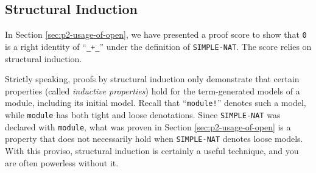 \documentclass[a4paper]{memoir}
\begin{document}
\subsection{Structural Induction}\label{sec:p2-proof-by-induction}

In Section \ref{sec:p2-usage-of-open}, we have presented a
proof score to show that \verb|0| is a right identity of ``\verb|_+_|''
under the definition of \verb|SIMPLE-NAT|. The score relies on
structural induction.

Strictly speaking, proofs by structural induction only demonstrate
that certain properties (called
{\em inductive properties}) hold for
the term-generated models of a module, including its initial model.
Recall that ``\verb|module!|'' denotes such a
model, while \verb|module| has both tight and loose denotations.
Since \verb|SIMPLE-NAT| was declared with \verb|module|, what was proven
in Section \ref{sec:p2-usage-of-open} is a property that does not
necessarily hold when \verb|SIMPLE-NAT| denotes loose models.
With this proviso, structural induction is certainly a useful
technique, and you are often powerless without it.
\end{document}
